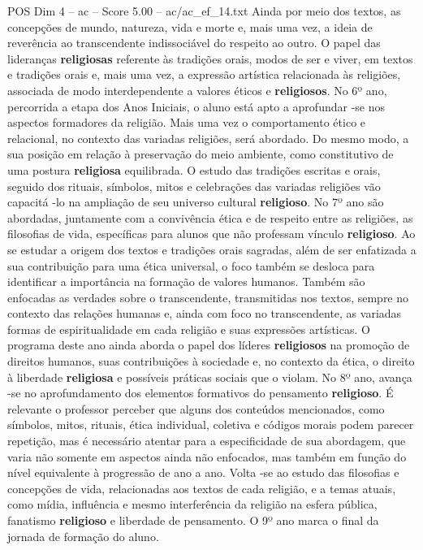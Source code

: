 \begin{textsample}{POS Dim 4 – ac – Score 5.00 – ac/ac\_ef\_14.txt}
Ainda por meio dos textos, as concepções de mundo, natureza, vida e morte e, mais uma vez, a ideia de reverência ao transcendente indissociável do respeito ao outro.
O papel das lideranças \textbf{religiosas} referente às tradições orais, modos de ser e viver, em textos e tradições orais e, mais uma vez, a expressão artística relacionada às religiões, associada de modo interdependente a valores éticos e \textbf{religiosos}.
No 6º ano, percorrida a etapa dos Anos Iniciais, o aluno está apto a aprofundar -se nos aspectos formadores da religião.
Mais uma vez o comportamento ético e relacional, no contexto das variadas religiões, será abordado.
Do mesmo modo, a sua posição em relação à preservação do meio ambiente, como constitutivo de uma postura \textbf{religiosa} equilibrada.
O estudo das tradições escritas e orais, seguido dos rituais, símbolos, mitos e celebrações das variadas religiões vão capacitá -lo na ampliação de seu universo cultural \textbf{religioso}.
No 7º ano são abordadas, juntamente com a convivência ética e de respeito entre as religiões, as filosofias de vida, específicas para alunos que não professam vínculo \textbf{religioso}.
Ao se estudar a origem dos textos e tradições orais sagradas, além de ser enfatizada a sua contribuição para uma ética universal, o foco também se desloca para identificar a importância na formação de valores humanos.
Também são enfocadas as verdades sobre o transcendente, transmitidas nos textos, sempre no contexto das relações humanas e, ainda com foco no transcendente, as variadas formas de espiritualidade em cada religião e suas expressões artísticas.
O programa deste ano ainda aborda o papel dos líderes \textbf{religiosos} na promoção de direitos humanos, suas contribuições à sociedade e, no contexto da ética, o direito à liberdade \textbf{religiosa} e possíveis práticas sociais que o violam.
No 8º ano, avança -se no aprofundamento dos elementos formativos do pensamento \textbf{religioso}.
É relevante o professor perceber que alguns dos conteúdos mencionados, como símbolos, mitos, rituais, ética individual, coletiva e códigos morais podem parecer repetição, mas é necessário atentar para a especificidade de sua abordagem, que varia não somente em aspectos ainda não enfocados, mas também em função do nível equivalente à progressão de ano a ano.
Volta -se ao estudo das filosofias e concepções de vida, relacionadas aos textos de cada religião, e a temas atuais, como mídia, influência e mesmo interferência da religião na esfera pública, fanatismo \textbf{religioso} e liberdade de pensamento.
O 9º ano marca o final da jornada de formação do aluno.

\end{textsample}
